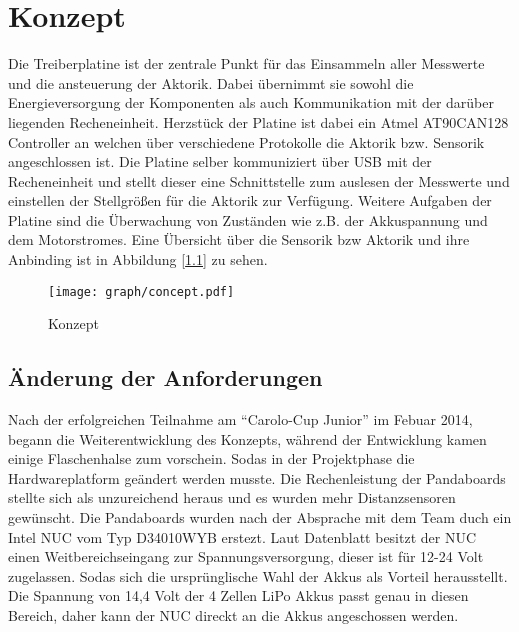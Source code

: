 
\chapter{Konzept}

Die Treiberplatine ist der zentrale Punkt für das Einsammeln aller Messwerte und die ansteuerung der Aktorik. Dabei übernimmt sie sowohl die Energieversorgung der Komponenten als auch
Kommunikation mit der darüber liegenden Recheneinheit. Herzstück der Platine ist dabei ein Atmel AT90CAN128 \textmu Controller an welchen über verschiedene Protokolle die Aktorik bzw. Sensorik
angeschlossen ist. Die Platine selber kommuniziert über USB mit der Recheneinheit und stellt dieser eine Schnittstelle zum auslesen der Messwerte und einstellen der Stellgrößen für die Aktorik
zur Verfügung. Weitere Aufgaben der Platine sind die Überwachung von Zuständen wie z.B. der Akkuspannung und dem Motorstromes. Eine Übersicht über die Sensorik bzw Aktorik und ihre Anbinding ist in 
Abbildung [\ref{fig:konzept}] zu sehen.

\begin{figure}[H]
\centering
\texttt{[image: graph/concept.pdf]}\\
\caption{Konzept}
\label{fig:konzept}
\end{figure}


\section{Änderung der Anforderungen}
Nach der erfolgreichen Teilnahme am ``Carolo-Cup Junior'' im Febuar 2014, begann die Weiterentwicklung des Konzepts, während der Entwicklung kamen
einige Flaschenhalse zum vorschein. Sodas in der Projektphase die Hardwareplatform geändert werden musste. Die Rechenleistung der Pandaboards stellte sich
als unzureichend heraus und es wurden mehr Distanzsensoren gewünscht. Die Pandaboards wurden nach der Absprache mit dem Team duch ein Intel NUC vom Typ
D34010WYB erstezt. Laut Datenblatt \cite{datasheet-nuc} besitzt der NUC einen Weitbereichseingang zur Spannungsversorgung, dieser ist für 12-24 Volt zugelassen.
Sodas sich die ursprünglische Wahl der Akkus als Vorteil herausstellt. Die Spannung von 14,4 Volt der 4 Zellen LiPo Akkus passt genau in diesen Bereich, daher
kann der NUC direckt an die Akkus angeschossen werden.






















